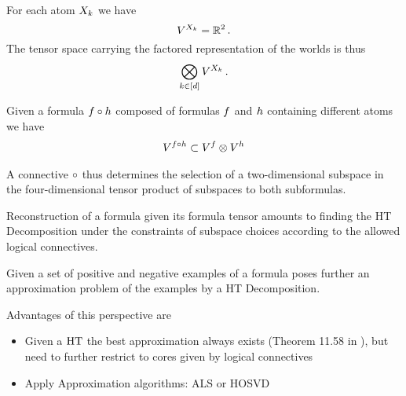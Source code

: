 For each atom $X_{k}$ we have
\[ V^{X_{k}} = \mathbb{R}^2 \, . \]
The tensor space carrying the factored representation of the worlds is thus
\begin{align}
    \bigotimes_{k\in[d]}V^{X_{k}} \, .
\end{align}


Given a formula $f\circ h$ composed of formulas $f$ and $h$ containing different atoms we have
\begin{align}
    V^{f\circ h}
    \subset V^{f} \otimes V^{h}
\end{align}

A connective $\circ$ thus determines the selection of a two-dimensional subspace in the four-dimensional tensor product of subspaces to both subformulas.


Reconstruction of a formula given its formula tensor amounts to finding the HT Decomposition under the constraints of subspace choices according to the allowed logical connectives.

Given a set of positive and negative examples of a formula poses further an approximation problem of the examples by a HT Decomposition.

Advantages of this perspective are
\begin{itemize}
    \item Given a $\mathrm{HT}$ the best approximation always exists (Theorem 11.58 in \cite{hackbusch_tensor_2012}), but need to further restrict to cores given by logical connectives
    \item Apply Approximation algorithms: ALS or HOSVD
\end{itemize}


%
%













